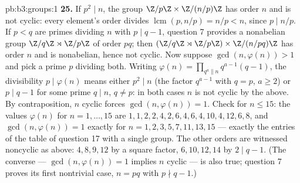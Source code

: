 \begin{solution}{pb:b3:groups:1}
\textbf{25.} If $p^2 \mid n$, the group $\Z/p\Z \times
\Z/(n/p)\Z$ has order $n$ and is not cyclic: every element's
order divides $\operatorname{lcm}(p, n/p) = n/p < n$, since
$p \mid n/p$. If $p < q$ are primes dividing $n$ with $p \mid
q - 1$, question 7 provides a nonabelian group $\Z/q\Z \rtimes
\Z/p\Z$ of order $pq$; then $(\Z/q\Z \rtimes \Z/p\Z) \times
\Z/(n/pq)\Z$ has order $n$ and is nonabelian, hence not
cyclic. Now suppose $\gcd(n, \varphi(n)) > 1$ and pick a prime
$p$ dividing both. Writing $\varphi(n) = \prod_{q^a \parallel
n} q^{a-1}(q - 1)$, the divisibility $p \mid \varphi(n)$
means either $p^2 \mid n$ (the factor $q^{a-1}$ with $q = p$,
$a \geq 2$) or $p \mid q - 1$ for some prime $q \mid n$, $q
\neq p$: in both cases $n$ is not cyclic by the above. By
contraposition, $n$ cyclic forces $\gcd(n, \varphi(n)) = 1$.
Check for $n \leq 15$: the values $\varphi(n)$ for $n = 1,
\dots, 15$ are $1, 1, 2, 2, 4, 2, 6, 4, 6, 4, 10, 4, 12, 6,
8$, and $\gcd(n, \varphi(n)) = 1$ exactly for $n = 1, 2, 3, 5,
7, 11, 13, 15$ --- exactly the entries of the table of
question 17 with a single group. The other orders are
witnessed noncyclic as above: $4, 8, 9, 12$ by a square
factor, $6, 10, 12, 14$ by $2 \mid q - 1$. (The converse ---
$\gcd(n, \varphi(n)) = 1$ implies $n$ cyclic --- is also true;
question 7 proves its first nontrivial case, $n = pq$ with
$p \nmid q - 1$.)
\end{solution}
